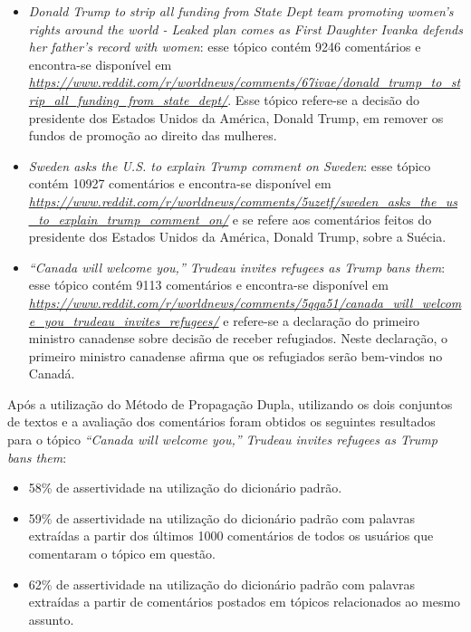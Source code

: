\begin{itemize}
  \item
  \textit{Donald Trump to strip all funding from State Dept team promoting
  women's rights around the world - Leaked plan comes as First Daughter Ivanka
  defends her father's record with women}: esse tópico contém 9246
  comentários e encontra-se disponível em
  \textit{\url{https://www.reddit.com/r/worldnews/comments/67ivae/donald_trump_to_strip_all_funding_from_state_dept/}}.
  Esse tópico refere-se a decisão do presidente dos Estados Unidos da América,
  Donald Trump, em remover os fundos de promoção ao direito das mulheres.
  \item
  \textit{Sweden asks the U.S. to explain Trump comment on
  Sweden}: esse tópico contém 10927
  comentários e encontra-se disponível em
  \textit{\url{https://www.reddit.com/r/worldnews/comments/5uzetf/sweden_asks_the_us_to_explain_trump_comment_on/}}
  e se refere aos comentários feitos do presidente dos Estados Unidos da
  América, Donald Trump, sobre a Suécia.
  
  \item\textit{“Canada will welcome you,” Trudeau invites refugees as Trump bans
  them}: esse tópico contém 9113
  comentários e encontra-se disponível em
  \textit{\url{https://www.reddit.com/r/worldnews/comments/5qqa51/canada_will_welcome_you_trudeau_invites_refugees/}}
  e refere-se a declaração do primeiro ministro canadense sobre decisão de
  receber refugiados. Neste declaração, o primeiro ministro canadense afirma que
  os refugiados serão bem-vindos no Canadá.
\end{itemize}
 
Após a utilização do Método de Propagação Dupla, utilizando os dois conjuntos
de textos e a avaliação dos comentários foram
obtidos os seguintes resultados para o tópico \textit{``Canada will welcome
you,” Trudeau invites refugees as Trump bans them}:
\begin{itemize}
  \item 58\% de assertividade na utilização do dicionário padrão.
  \item 59\% de assertividade na utilização do dicionário padrão com palavras
  extraídas a partir dos últimos 1000 comentários de todos os usuários que
  comentaram o tópico em questão.
  \item 62\% de assertividade na utilização do dicionário padrão com palavras
  extraídas a partir de comentários postados em tópicos relacionados ao mesmo
  assunto.
\end{itemize}

